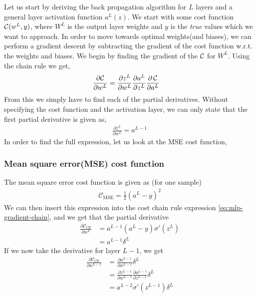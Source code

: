 Let us start by deriving the back propagation algorithm for $L$ layers and a general layer activation function $a^L(z)$. We start with some cost function $\operatorname*{\mathcal{C}}(w^L, y)$, where $W^L$ is the output layer weights and $y$ is the \textit{true} values which we want to approach. In order to move towards optimal weights(and biases), we can perform a gradient descent by subtracting the gradient of the cost function w.r.t. the weights and biases. We begin by finding the gradient of the $\operatorname*{\mathcal{C}}$ for $W^L$. Using the chain rule we get,
\begin{align}
    \frac{\partial \mathcal{C}}{\partial w^L} &= \frac{\partial z^L}{\partial w^L} \frac{\partial a^L}{\partial z^L} \frac{\partial \operatorname*{\mathcal{C}}}{\partial a^L}
    \label{eq:mlp-gradient-chain}
\end{align}
From this we simply have to find each of the partial derivatives. Without specifying the cost function and the activation layer, we can only state that the first partial derivative is given as,
\begin{align*}
\frac{\partial z^L}{\partial w^L} = a^{L-1}
\end{align*}
In order to find the full expression, let us look at the MSE cost function,

\subsubsection{Mean square error(MSE) cost function}
The mean square error cost function is given as (for one sample)
\begin{align}
    \mathcal{C}_\mathrm{MSE} = \frac{1}{2} (a^L - y)^2
    \label{eq:mse-mlp-cost}
\end{align}
We can then insert this expression into the cost chain rule expression \eqref{eq:mlp-gradient-chain}, and we get that the partial derivative
\begin{align*}
    \frac{\partial \mathcal{C}_\mathrm{CE}}{\partial w^L} &= a^{L-1}(a^L - y)\sigma'(z^L) \\
    &= a^{L-1} \delta^L
\end{align*}
If we now take the derivative for layer $L-1$, we get
\begin{align*}
    \frac{\partial \mathcal{C}_\mathrm{CE}}{\partial w^{L-1}} &= \frac{\partial a^{L-1}}{\partial w^{L-1}} \delta^L \\
    &= \frac{\partial z^{L-1}}{\partial w^{L-1}} \frac{\partial a^{L-1}}{\partial z^{L-1}} \delta^L \\
    &= a^{L-2}\sigma'(z^{L-1})\delta^L
\end{align*}

